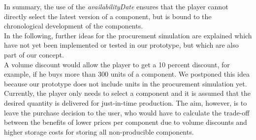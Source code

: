 In summary, the use of the \textit{availabilityDate} ensures that the player cannot directly select the latest version of a component, but is bound to the chronological development of the components.\\
\newline
In the following, further ideas for the procurement simulation are explained which have not yet been implemented or tested in our prototype, but which are also part of our concept.\\
A volume discount would allow the player to get a 10 percent discount, for example, if he buys more than 300 units of a component. We postponed this idea because our prototype does not include units in the procurement simulation yet. Currently, the player only needs to select a component and it is assumed that the desired quantity is delivered for just-in-time production. 
The aim, however, is to leave the purchase decision to the user, who would have to calculate the trade-off between the benefits of lower prices per component due to volume discounts and higher storage costs for storing all non-producible components.

